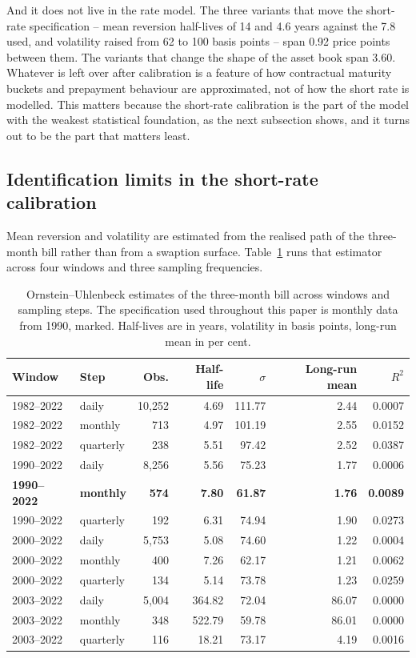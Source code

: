 And it does not live in the rate model. The three variants that move the short-rate
specification -- mean reversion half-lives of 14 and 4.6 years against the 7.8 used,
and volatility raised from 62 to 100 basis points -- span 0.92 price points between
them. The variants that change the shape of the asset book span 3.60. Whatever is
left over after calibration is a feature of how contractual maturity buckets and
prepayment behaviour are approximated, not of how the short rate is modelled. This
matters because the short-rate calibration is the part of the model with the weakest
statistical foundation, as the next subsection shows, and it turns out to be the part
that matters least.

\subsection{Identification limits in the short-rate calibration}

Mean reversion and volatility are estimated from the realised path of the three-month
bill rather than from a swaption surface. Table~\ref{tab:ou} runs that estimator
across four windows and three sampling frequencies.

\begin{table}[htbp]
\centering
\caption{Ornstein--Uhlenbeck estimates of the three-month bill across windows and
sampling steps. The specification used throughout this paper is monthly data from
1990, marked. Half-lives are in years, volatility in basis points, long-run mean in
per cent.}
\label{tab:ou}
\small
\begin{tabular}{llrrrrr}
\toprule
Window & Step & Obs. & Half-life & $\sigma$ & Long-run mean & $R^2$ \\
\midrule
1982--2022 & daily     & 10,252 & 4.69   & 111.77 & 2.44  & 0.0007 \\
1982--2022 & monthly   & 713    & 4.97   & 101.19 & 2.55  & 0.0152 \\
1982--2022 & quarterly & 238    & 5.51   & 97.42  & 2.52  & 0.0387 \\
1990--2022 & daily     & 8,256  & 5.56   & 75.23  & 1.77  & 0.0006 \\
\textbf{1990--2022} & \textbf{monthly} & \textbf{574} & \textbf{7.80} & \textbf{61.87} & \textbf{1.76} & \textbf{0.0089} \\
1990--2022 & quarterly & 192    & 6.31   & 74.94  & 1.90  & 0.0273 \\
2000--2022 & daily     & 5,753  & 5.08   & 74.60  & 1.22  & 0.0004 \\
2000--2022 & monthly   & 400    & 7.26   & 62.17  & 1.21  & 0.0062 \\
2000--2022 & quarterly & 134    & 5.14   & 73.78  & 1.23  & 0.0259 \\
2003--2022 & daily     & 5,004  & 364.82 & 72.04  & 86.07 & 0.0000 \\
2003--2022 & monthly   & 348    & 522.79 & 59.78  & 86.01 & 0.0000 \\
2003--2022 & quarterly & 116    & 18.21  & 73.17  & 4.19  & 0.0016 \\
\bottomrule
\end{tabular}
\end{table}

